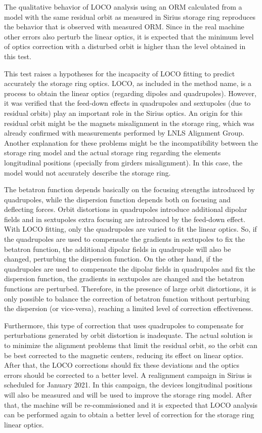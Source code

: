 The qualitative behavior of LOCO analysis using an ORM calculated from a model with the same residual orbit as measured in Sirius storage ring reproduces the behavior that is observed with measured ORM. Since in the real machine other errors also perturb the linear optics, it is expected that the minimum level of optics correction with a disturbed orbit is higher than the level obtained in this test. 

This test raises a hypotheses for the incapacity of LOCO fitting to predict accurately the storage ring optics. LOCO, as included in the method name, is a process to obtain the linear optics (regarding dipoles and quadrupoles). However, it was verified that the feed-down effects in quadrupoles and sextupoles (due to residual orbits) play an important role in the Sirius optics. An origin for this residual orbit might be the magnets misalignment in the storage ring, which was already confirmed with measurements performed by LNLS Alignment Group. Another explanation for these problems might be the incompatibility between the storage ring model and the actual storage ring regarding the elements longitudinal positions (specially from girders misalignment). In this case, the model would not accurately describe the storage ring.

The betatron function depends basically on the focusing strengths introduced by quadrupoles, while the dispersion function depends both on focusing and deflecting forces. Orbit distortions in quadrupoles introduce additional dipolar fields and in sextupoles extra focusing are introduced by the feed-down effect. With LOCO fitting, only the quadrupoles are varied to fit the linear optics. So, if the quadrupoles are used to compensate the gradients in sextupoles to fix the betatron function, the additional dipolar fields in quadrupole will also be changed, perturbing the dispersion function. On the other hand, if the quadrupoles are used to compensate the dipolar fields in quadrupoles and fix the dispersion function, the gradients in sextupoles are changed and the betatron functions are perturbed. Therefore, in the presence of large orbit distortions, it is only possible to balance the correction of betatron function without perturbing the dispersion (or vice-versa), reaching a limited level of correction effectiveness.

Furthermore, this type of correction that uses quadrupoles to compensate for perturbations generated by orbit distortion is inadequate. The actual solution is to minimize the alignment problems that limit the residual orbit, so the orbit can be best corrected to the magnetic centers, reducing its effect on linear optics. After that, the LOCO corrections should fix these deviations and the optics errors should be corrected to a better level. A realignment campaign in Sirius is scheduled for January 2021. In this campaign, the devices longitudinal positions will also be measured and will be used to improve the storage ring model. After that, the machine will be re-commissioned and it is expected that LOCO analysis can be performed again to obtain a better level of correction for the storage ring linear optics.
